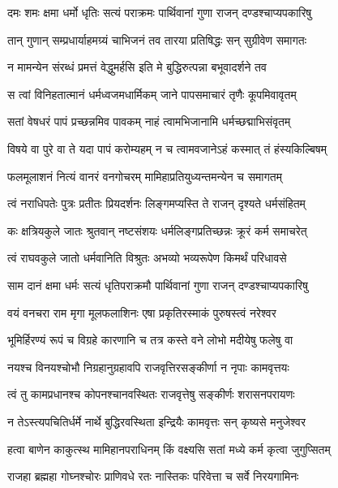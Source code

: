 \twolineshloka
{दमः शमः क्षमा धर्मो धृतिः सत्यं पराक्रमः}
{पार्थिवानां गुणा राजन् दण्डश्चाप्यपकारिषु} %

\twolineshloka
{तान् गुणान् सम्प्रधार्याहमग्र्यं चाभिजनं तव}
{तारया प्रतिषिद्धः सन् सुग्रीवेण समागतः} %

\twolineshloka
{न मामन्येन संरब्धं प्रमत्तं वेद्धुमर्हसि}
{इति मे बुद्धिरुत्पन्ना बभूवादर्शने तव} %

\twolineshloka
{स त्वां विनिहतात्मानं धर्मध्वजमधार्मिकम्}
{जाने पापसमाचारं तृणैः कूपमिवावृतम्} %

\twolineshloka
{सतां वेषधरं पापं प्रच्छन्नमिव पावकम्}
{नाहं त्वामभिजानामि धर्मच्छद्माभिसंवृतम्} %

\twolineshloka
{विषये वा पुरे वा ते यदा पापं करोम्यहम्}
{न च त्वामवजानेऽहं कस्मात् तं हंस्यकिल्बिषम्} %

\twolineshloka
{फलमूलाशनं नित्यं वानरं वनगोचरम्}
{मामिहाप्रतियुध्यन्तमन्येन च समागतम्} %

\twolineshloka
{त्वं नराधिपतेः पुत्रः प्रतीतः प्रियदर्शनः}
{लिङ्गमप्यस्ति ते राजन् दृश्यते धर्मसंहितम्} %

\twolineshloka
{कः क्षत्रियकुले जातः श्रुतवान् नष्टसंशयः}
{धर्मलिङ्गप्रतिच्छन्नः क्रूरं कर्म समाचरेत्} %

\twolineshloka
{त्वं राघवकुले जातो धर्मवानिति विश्रुतः}
{अभव्यो भव्यरूपेण किमर्थं परिधावसे} %

\twolineshloka
{साम दानं क्षमा धर्मः सत्यं धृतिपराक्रमौ}
{पार्थिवानां गुणा राजन् दण्डश्चाप्यपकारिषु} %

\twolineshloka
{वयं वनचरा राम मृगा मूलफलाशिनः}
{एषा प्रकृतिरस्माकं पुरुषस्त्वं नरेश्वर} %

\twolineshloka
{भूमिर्हिरण्यं रूपं च विग्रहे कारणानि च}
{तत्र कस्ते वने लोभो मदीयेषु फलेषु वा} %

\twolineshloka
{नयश्च विनयश्चोभौ निग्रहानुग्रहावपि}
{राजवृत्तिरसङ्कीर्णा न नृपाः कामवृत्तयः} %

\twolineshloka
{त्वं तु कामप्रधानश्च कोपनश्चानवस्थितः}
{राजवृत्तेषु सङ्कीर्णः शरासनपरायणः} %

\twolineshloka
{न तेऽस्त्यपचितिर्धर्मे नार्थे बुद्धिरवस्थिता}
{इन्द्रियैः कामवृत्तः सन् कृष्यसे मनुजेश्वर} %

\twolineshloka
{हत्वा बाणेन काकुत्स्थ मामिहानपराधिनम्}
{किं वक्ष्यसि सतां मध्ये कर्म कृत्वा जुगुप्सितम्} %

\twolineshloka
{राजहा ब्रह्महा गोघ्नश्चोरः प्राणिवधे रतः}
{नास्तिकः परिवेत्ता च सर्वे निरयगामिनः} %

